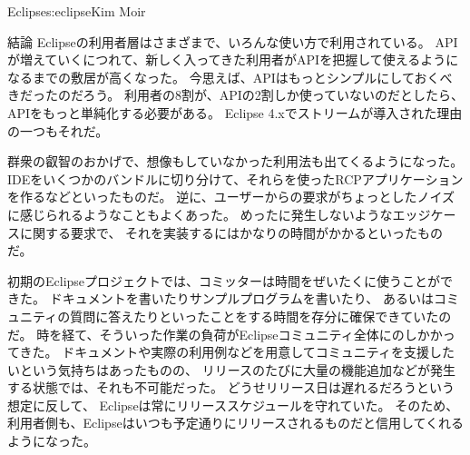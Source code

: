\begin{aosachapter}{Eclipse}{s:eclipse}{Kim Moir}
\begin{aosasect1}{結論}
Eclipseの利用者層はさまざまで、いろんな使い方で利用されている。
APIが増えていくにつれて、新しく入ってきた利用者がAPIを把握して使えるようになるまでの敷居が高くなった。
今思えば、APIはもっとシンプルにしておくべきだったのだろう。
利用者の8割が、APIの2割しか使っていないのだとしたら、APIをもっと単純化する必要がある。
Eclipse 4.xでストリームが導入された理由の一つもそれだ。

群衆の叡智のおかげで、想像もしていなかった利用法も出てくるようになった。
IDEをいくつかのバンドルに切り分けて、それらを使ったRCPアプリケーションを作るなどといったものだ。
逆に、ユーザーからの要求がちょっとしたノイズに感じられるようなこともよくあった。
めったに発生しないようなエッジケースに関する要求で、
それを実装するにはかなりの時間がかかるといったものだ。

初期のEclipseプロジェクトでは、コミッターは時間をぜいたくに使うことができた。
ドキュメントを書いたりサンプルプログラムを書いたり、
あるいはコミュニティの質問に答えたりといったことをする時間を存分に確保できていたのだ。
時を経て、そういった作業の負荷がEclipseコミュニティ全体にのしかかってきた。
ドキュメントや実際の利用例などを用意してコミュニティを支援したいという気持ちはあったものの、
リリースのたびに大量の機能追加などが発生する状態では、それも不可能だった。
どうせリリース日は遅れるだろうという想定に反して、
Eclipseは常にリリーススケジュールを守れていた。
そのため、利用者側も、Eclipseはいつも予定通りにリリースされるものだと信用してくれるようになった。


\end{aosasect1}
\end{aosachapter}

